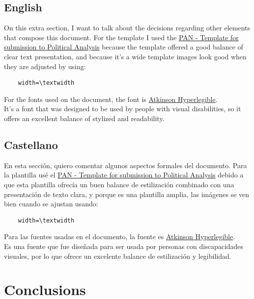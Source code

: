 \documentclass{cup-pan}
\begin{document}
\subsection{English}
On this extra section, I want to talk about the decisions regarding other elements that compose this document. 
For the template I used the 
\href{https://www.overleaf.com/latex/templates/pan-template-for-submission-to-political-analysis/csxqmspqzntv}{PAN - Template for submission to Political Analysis} because the template offered a good balance of clear text presentation, and because it's a wide template images look good when they are adjusted by using:
\begin{verbatim} 
    width=\textwidth 
\end{verbatim}

For the fonts used on the document, the font is 
\href{https://brailleinstitute.org/freefont}{Atkinson Hyperlegible}.\\
It's a font that was designed to be used by people with visual disabilities, so it offers an excellent balance of stylized and readability.\\

\subsection{Castellano}

En esta sección, quiero comentar algunos aspectos  formales del documento.
Para la plantilla usé el \href{https://www.overleaf.com/latex/templates/pan-template-for-submission-to-political-analysis/csxqmspqzntv}{PAN - Template for submission to Political Analysis} debido a que esta plantilla ofrecía un buen balance de estilización combinado con una presentación de texto clara, y porque es una plantilla amplia, las imágenes se ven bien cuando se ajustan usando:

\begin{verbatim} 
    width=\textwidth 
\end{verbatim}

Para las fuentes usadas en el documento, la fuente es \href{https://brailleinstitute.org/freefont}{Atkinson Hyperlegible}.\\
Es una fuente que fue diseñada para ser usada por personas con discapacidades visuales, por lo que ofrece un excelente balance de estilización y legibilidad.\\

\newpage
\section{Conclusions}
\end{document}
